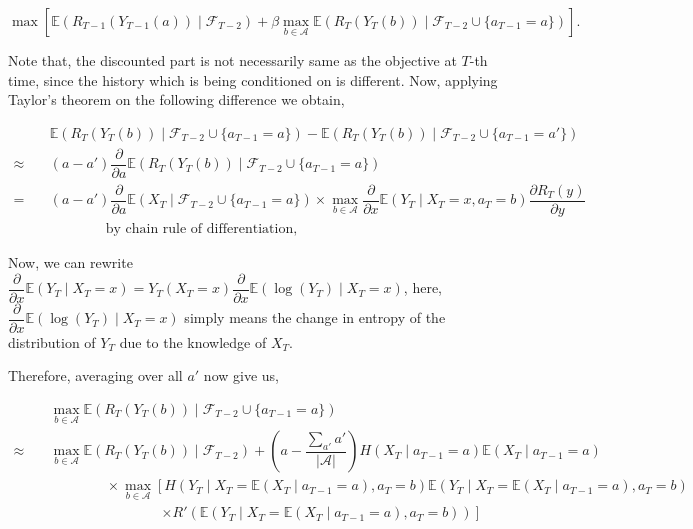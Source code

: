 \documentclass[11pt]{article}
\newcommand{\E}{\mathbb{E}}
\newcommand{\Acal}{\mathcal{A}}
\newcommand{\Fcal}{\mathcal{F}}
\begin{document}
\begin{equation}
    \max\left[ \E(R_{T-1}(Y_{T-1}(a)) \mid \Fcal_{T-2}) + \beta \max_{b \in \Acal} \E(R_T(Y_T(b)) \mid \Fcal_{T-2} \cup \{ a_{T-1} = a \}) \right].
    \label{eqn:Rt-objective}    
\end{equation}

\noindent Note that, the discounted part is not necessarily same as the objective at $T$-th time, since the history which is being conditioned on is different. Now, applying Taylor's theorem on the following difference we obtain,

\begin{align*}
    & \E(R_T(Y_T(b)) \mid \Fcal_{T-2} \cup \{ a_{T-1} = a\} ) - \E(R_T(Y_T(b)) \mid \Fcal_{T-2} \cup \{ a_{T-1} = a'\} )\\
    \approx \quad & (a - a') \dfrac{\partial}{\partial a}\E(R_T(Y_T(b)) \mid \Fcal_{T-2} \cup \{ a_{T-1} = a\} )\\
    = \quad & (a - a') \dfrac{\partial}{\partial a} \E(X_T \mid \Fcal_{T-2} \cup \{a_{T-1} = a\}) \times \max_{b\in \Acal}\dfrac{\partial}{\partial x}\E(Y_T\mid X_T = x, a_T = b) \dfrac{\partial R_T(y)}{\partial y}\\
     & \qquad \qquad \text{by chain rule of differentiation},
\end{align*}

\noindent Now, we can rewrite $\dfrac{\partial}{\partial x}\E(Y_T \mid X_T = x) = Y_T(X_T = x) \dfrac{\partial}{\partial x}\E(\log(Y_T) \mid X_T = x)$, here, $\dfrac{\partial}{\partial x}\E(\log(Y_T) \mid X_T = x)$ simply means the change in entropy of the distribution of $Y_T$ due to the knowledge of $X_T$. 

Therefore, averaging over all $a'$ now give us,

\begin{align*}
    & \max_{b \in \Acal} \E(R_T(Y_T(b)) \mid \Fcal_{T-2} \cup \{ a_{T-1} = a\} )\\
    \approx \quad & \max_{b \in \Acal} \E(R_T(Y_T(b)) \mid \Fcal_{T-2} ) + \left( a - \dfrac{\sum_{a'} a'}{\vert \Acal \vert} \right) H(X_T \mid a_{T-1} = a) \E(X_T\mid a_{T-1} = a) \\
    & \qquad \qquad \times \max_{b \in \Acal}\left[ H(Y_T \mid X_T = \E(X_T\mid a_{T-1} = a), a_T = b) \E(Y_T \mid X_T = \E(X_T\mid a_{T-1} = a), a_T = b) \right. \\
    & \qquad \qquad \qquad \qquad \left. \times R'(\E(Y_T \mid X_T = \E(X_T\mid a_{T-1} = a), a_T = b)) \right] 
\end{align*}
\end{document}
